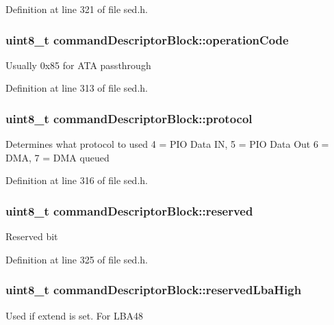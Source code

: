 Definition at line 321 of file sed.\+h.

\hypertarget{structcommandDescriptorBlock_aaf9440d8f5eaef468ced9ccf5a35a198}{
\subsubsection[{operation\+Code}]{\setlength{\rightskip}{0pt plus 5cm}uint8\+\_\+t command\+Descriptor\+Block\+::operation\+Code}}\label{structcommandDescriptorBlock_aaf9440d8f5eaef468ced9ccf5a35a198}
Usually 0x85 for A\+T\+A passthrough 

Definition at line 313 of file sed.\+h.

\hypertarget{structcommandDescriptorBlock_a0c372c0939eb5afd3e675f4fa39b0d64}{
\subsubsection[{protocol}]{\setlength{\rightskip}{0pt plus 5cm}uint8\+\_\+t command\+Descriptor\+Block\+::protocol}}\label{structcommandDescriptorBlock_a0c372c0939eb5afd3e675f4fa39b0d64}
Determines what protocol to used 4 = P\+I\+O Data I\+N, 5 = P\+I\+O Data Out 6 = D\+M\+A, 7 = D\+M\+A queued 

Definition at line 316 of file sed.\+h.

\hypertarget{structcommandDescriptorBlock_aceaec39d01724e696ce1e60c96e72d11}{
\subsubsection[{reserved}]{\setlength{\rightskip}{0pt plus 5cm}uint8\+\_\+t command\+Descriptor\+Block\+::reserved}}\label{structcommandDescriptorBlock_aceaec39d01724e696ce1e60c96e72d11}
Reserved bit 

Definition at line 325 of file sed.\+h.

\hypertarget{structcommandDescriptorBlock_a1703f9519bff3df0efa2c19b2896244f}{
\subsubsection[{reserved\+Lba\+High}]{\setlength{\rightskip}{0pt plus 5cm}uint8\+\_\+t command\+Descriptor\+Block\+::reserved\+Lba\+High}}\label{structcommandDescriptorBlock_a1703f9519bff3df0efa2c19b2896244f}
Used if extend is set. For L\+B\+A48 

